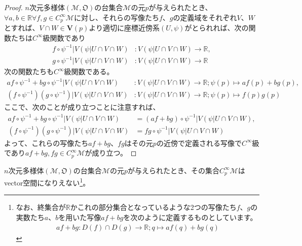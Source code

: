 \documentclass[dvipdfmx]{jsarticle}
\begin{document}
\begin{proof}
  $n$次元多様体$\left(\mathcal{M},\mathfrak{O}\right)$の台集合$\mathcal{M}$の元$p$が与えられたとき、$\forall a,b\in \mathbb{R} \forall f,g\in C^\infty_p \mathcal{M}$に対し、それらの写像たち$f$、$g$の定義域をそれぞれ$V$、$W$とすれば、$V\cap W \in \mathbf{V} \left( p\right) $より適切に座標近傍系$\left(U,\psi\right)$がとられれば、次の関数たちは$C^\infty $級関数であり
  \begin{align*}
    f\circ \psi^{-1} |V\left(\psi | U\cap V\cap W \right) &: V\left(\psi | U\cap V\cap W \right) \rightarrow \mathbb{R}, \\
    g\circ \psi^{-1} |V\left(\psi | U\cap V\cap W \right) &: V\left(\psi | U\cap V\cap W \right) \rightarrow \mathbb{R} 
  \end{align*}
  次の関数たちも$C^\infty $級関数である。
  \begin{align*}
    af\circ \psi^{-1} +bg\circ \psi^{-1} |V\left(\psi | U\cap V\cap W \right) &: V\left(\psi | U\cap V\cap W \right) \rightarrow \mathbb{R};\psi\left(p\right) \mapsto af\left(p\right) +bg\left(p\right), \\
    \left( f\circ \psi^{-1} \right) \left( g\circ \psi^{-1} \right) |V\left(\psi | U\cap V\cap W \right) &: V\left(\psi | U\cap V\cap W \right) \rightarrow \mathbb{R} ;\psi\left(p\right) \mapsto f\left(p\right) g\left(p\right) 
  \end{align*}
  ここで、次のことが成り立つことに注意すれば、
  \begin{align*}
    af\circ \psi^{-1} +bg\circ \psi^{-1} |V\left(\psi | U\cap V\cap W \right) &= \left( af+bg \right) \circ \psi^{-1} |V\left(\psi | U\cap V\cap W \right) ,\\
    \left( f\circ \psi^{-1} \right) \left( g\circ \psi^{-1} \right) |V\left(\psi | U\cap V\cap W \right) &= fg\circ \psi^{-1} |V\left(\psi | U\cap V\cap W \right) 
  \end{align*}
  よって、これらの写像たち$af+bg$、$fg$はその元$p$の近傍で定義される写像で$C^\infty $級であり$af+bg,fg\in C^\infty_p \mathcal{M} $が成り立つ。
\end{proof}
\begin{thm}\label{8.3.3.2}
  $n$次元多様体$\left(\mathcal{M},\mathfrak{O}\right)$の台集合$\mathcal{M}$の元$p$が与えられたとき、その集合$C^\infty_p \mathcal{M} $はvector空間になりえない\footnote{なお、終集合が$\mathbb{R}$かこれの部分集合となっているような2つの写像たち$f$、$g$の実数たち$a$、$b$を用いた写像$af+bg$を次のように定義するものとしています。
  \begin{align*}
    af+bg:D\left(f\right)\cap D\left(g\right)\rightarrow \mathbb{R} ;q\mapsto af\left(q\right) +bg\left(q\right)
  \end{align*}}。
\end{thm}
\end{document}
